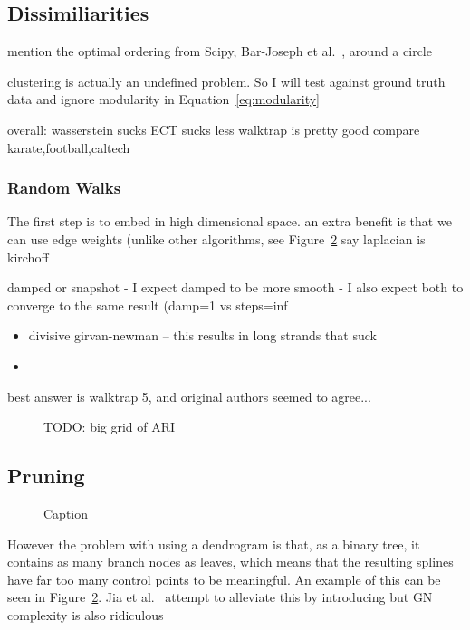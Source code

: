 \subsection{Dissimiliarities}
\label{sec:dissimilarities}

mention the optimal ordering from Scipy, Bar-Joseph et al.~\cite{TODO}, around a circle

clustering is actually an undefined problem. So I will test against ground truth data and ignore modularity in Equation~\eqref{eq:modularity}

overall:
wasserstein sucks
ECT sucks less \cite{Albano2012}
walktrap is pretty good
compare karate,football,caltech

\subsubsection{Random Walks}
The first step is to embed in high dimensional space.
an extra benefit is that we can use edge weights (unlike other algorithms, see Figure~\ref{fig:lesmis}
say laplacian is kirchoff

damped or snapshot
 - I expect damped to be more smooth
 - I also expect both to converge to the same result (damp=1 vs steps=inf

\begin{itemize}
    \item divisive girvan-newman -- this results in long strands that suck
    \item
\end{itemize}

best answer is walktrap 5, and original authors seemed to agree...

\begin{figure}
    \caption{TODO: big grid of ARI}
    \label{fig:ARI}
\end{figure}

\subsection{Pruning}
\label{sec:pruning}
\begin{figure}
    \caption{Caption}
    \label{fig:lesmis}
\end{figure}
However the problem with using a dendrogram is that, as a binary tree, it contains as many branch nodes as leaves, which means that the resulting splines have far too many control points to be meaningful. An example of this can be seen in Figure~\ref{fig:lesmis}.
Jia et al.~\cite{Jia2011} attempt to alleviate this by introducing 
but GN complexity is also ridiculous

